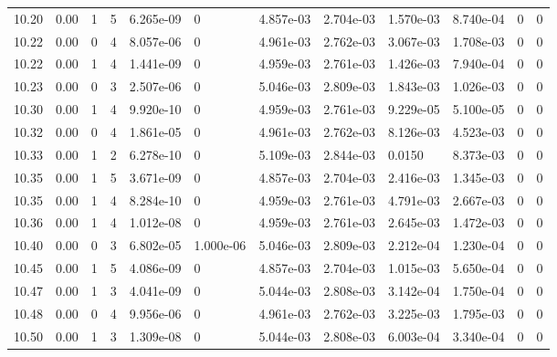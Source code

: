 \documentclass[preview]{standalone}
\begin{document}
{{{{{{{{{{{{{\begin{tabular}{L{1.2cm}C{1.2cm} C{0.3cm}C{0.5cm} C{1.4cm}C{1.4cm} C{1.4cm}C{1.4cm} C{1.6cm}C{1.6cm} C{1.6cm}C{1.6cm}}
  10.20  &  0.00  & 1     &  5 &  6.265e-09  & 0  &  4.857e-03&   2.704e-03& 1.570e-03 & 8.740e-04   &  0 & 0  \\ 
  10.22  &  0.00  & 0     &  4 &  8.057e-06  & 0  &  4.961e-03&   2.762e-03& 3.067e-03 & 1.708e-03   &  0 & 0  \\ 
  10.22  &  0.00  & 1     &  4 &  1.441e-09  & 0  &  4.959e-03&   2.761e-03& 1.426e-03 & 7.940e-04   &  0 & 0  \\ 
  10.23  &  0.00  & 0     &  3 &  2.507e-06  & 0  &  5.046e-03&   2.809e-03& 1.843e-03 & 1.026e-03   &  0 & 0  \\ 
  10.30  &  0.00  & 1     &  4 &  9.920e-10  & 0  &  4.959e-03&   2.761e-03& 9.229e-05 & 5.100e-05   &  0 & 0  \\ 
  10.32  &  0.00  & 0     &  4 &  1.861e-05  & 0  &  4.961e-03&   2.762e-03& 8.126e-03 & 4.523e-03   &  0 & 0  \\ 
  10.33  &  0.00  & 1     &  2 &  6.278e-10  & 0  &  5.109e-03&   2.844e-03& 0.0150 & 8.373e-03   &  0 & 0  \\ 
  10.35  &  0.00  & 1     &  5 &  3.671e-09  & 0  &  4.857e-03&   2.704e-03& 2.416e-03 & 1.345e-03   &  0 & 0  \\ 
  10.35  &  0.00  & 1     &  4 &  8.284e-10  & 0  &  4.959e-03&   2.761e-03& 4.791e-03 & 2.667e-03   &  0 & 0  \\ 
  10.36  &  0.00  & 1     &  4 &  1.012e-08  & 0  &  4.959e-03&   2.761e-03& 2.645e-03 & 1.472e-03   &  0 & 0  \\ 
  10.40  &  0.00  & 0     &  3 &  6.802e-05  & 1.000e-06  &  5.046e-03&   2.809e-03& 2.212e-04 & 1.230e-04   &  0 & 0  \\ 
  10.45  &  0.00  & 1     &  5 &  4.086e-09  & 0  &  4.857e-03&   2.704e-03& 1.015e-03 & 5.650e-04   &  0 & 0  \\ 
  10.47  &  0.00  & 1     &  3 &  4.041e-09  & 0  &  5.044e-03&   2.808e-03& 3.142e-04 & 1.750e-04   &  0 & 0  \\ 
  10.48  &  0.00  & 0     &  4 &  9.956e-06  & 0  &  4.961e-03&   2.762e-03& 3.225e-03 & 1.795e-03   &  0 & 0  \\ 
  10.50  &  0.00  & 1     &  3 &  1.309e-08  & 0  &  5.044e-03&   2.808e-03& 6.003e-04 & 3.340e-04   &  0 & 0  \\ 
\hline 
\end{tabular} 

}}}}}}}}}}}}}
\end{document}
